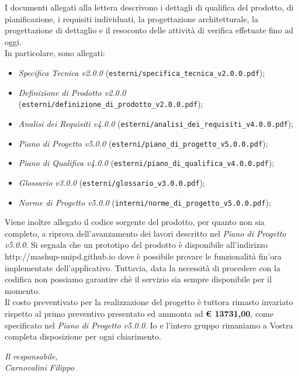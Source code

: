 \documentclass[10pt,a4paper,sans]{moderncv}        %
\begin{document}
\vfill
I documenti allegati alla lettera descrivono i dettagli di qualifica del prodotto, di pianificazione, i requisiti individuati, la progettazione architetturale, la progettazione di dettaglio e il resoconto delle attività di verifica effetuate fino ad oggi.\\ 
\vfill
In particolare, sono allegati:
	\begin{itemize}
		\item \textit{Specifica Tecnica v2.0.0} ({\verb!esterni/specifica_tecnica_v2.0.0.pdf!});
		\item \textit{Definizione di Prodotto v2.0.0} ({\verb!esterni/definizione_di_prodotto_v2.0.0.pdf!});
		\item \textit{Analisi dei Requisiti v4.0.0} ({\verb!esterni/analisi_dei_requisiti_v4.0.0.pdf!});
		\item \textit{Piano di Progetto v5.0.0} ({\verb!esterni/piano_di_progetto_v5.0.0.pdf!});
		\item \textit{Piano di Qualifica v4.0.0} ({\verb!esterni/piano_di_qualifica_v4.0.0.pdf!});
		\item \textit{Glossario v3.0.0} ({\verb!esterni/glossario_v3.0.0.pdf!});
		\item \textit{Norme di Progetto v5.0.0} ({\verb!interni/norme_di_progetto_v5.0.0.pdf!});
	\end{itemize}
\noindent
Viene inoltre allegato il codice sorgente del prodotto, per quanto non sia completo, a riprova dell'avanzamento dei lavori descritto nel \textit{Piano di Progetto v5.0.0}. Si segnala che un prototipo del prodotto è disponibile all'indirizzo http://mashup-unipd.github.io dove è possibile provare le funzionalità fin'ora implementate dell'applicativo. Tuttavia, data la necessità di procedere con la codifica non possiamo garantire chè il servizio sia sempre disponibile per il momento.\\ 
\vfill
Il costo preventivato per la realizzazione del progetto è tuttora rimasto invariato rispetto al primo preventivo presentato ed ammonta ad \textbf{\euro{} 13731,00}, come specificato nel \textit{Piano di Progetto v5.0.0}. \newline Io e l'intero gruppo rimaniamo a Vostra completa disposizione per ogni chiarimento.
	\begin{flushright}
		\textit{Il responsabile,}\\ 
		\textit{Carnovalini Filippo}
	\end{flushright}
\end{document}
